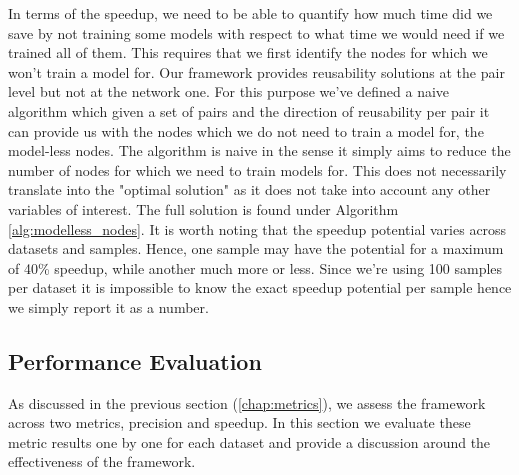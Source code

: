 \documentclass{mpaper}
\begin{document}
In terms of the speedup, we need to be able to quantify how much time did we save by not training some models with respect to what time we would need if we trained all of them. This requires that we first identify the nodes for which we won't train a model for. Our framework provides reusability solutions at the pair level but not at the network one. For this purpose we've defined a naive algorithm which given a set of pairs and the direction of reusability per pair it can provide us with the nodes which we do not need to train a model for, the model-less nodes. The algorithm is naive in the sense it simply aims to reduce the number of nodes for which we need to train models for. This does not necessarily translate into the "optimal solution" as it does not take into account any other variables of interest. The full solution is found under Algorithm \ref{alg:modelless_nodes}. It is worth noting that the speedup potential varies across datasets and samples. Hence, one sample may have the potential for a maximum of 40\% speedup, while another much more or less. Since we're using 100 samples per dataset it is impossible to know the exact speedup potential per sample hence we simply report it as a number. 

\subsection{Performance Evaluation}

As discussed in the previous section (\ref{chap:metrics}), we assess the framework across two metrics, precision and speedup. In this section we evaluate these metric results one by one for each dataset and provide a discussion around the effectiveness of the framework.
\end{document}
